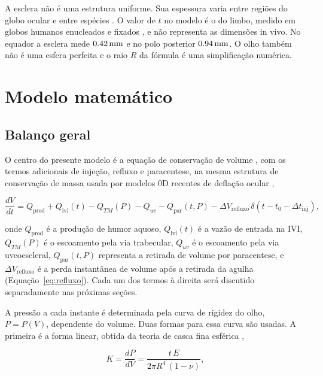 A esclera não é uma estrutura uniforme. Sua espessura varia entre regiões do globo ocular e entre espécies \citep{vurgese2012,olsen1998,prince1960}. O valor de $t$ no modelo é o do limbo, medido em globos humanos enucleados e fixados \citep{vurgese2012}, e não representa as dimensões in vivo. No equador a esclera mede $\SI{0{,}42}{\milli\meter}$ e no polo posterior $\SI{0{,}94}{\milli\meter}$. O olho também não é uma esfera perfeita e o raio $R$ da fórmula é uma simplificação numérica.

\section{Modelo matemático}

\subsection{Balanço geral}
\label{sec:balanco_geral}

O centro do presente modelo é a equação de conservação de volume \citep{goel2010}, com os termos adicionais de injeção, refluxo e paracentese, na mesma estrutura de conservação de massa usada por modelos 0D recentes de deflação ocular \citep{ruffini2024},

\begin{equation}
\frac{dV}{dt} = Q_{\text{prod}} + Q_{\text{ivi}}(t) - Q_{TM}(P) - Q_{uv} - Q_{\text{par}}(t,P) - \Delta V_{\text{refluxo}}\,\delta\!\left(t-t_0-\Delta t_{\text{inj}}\right),
\label{eq:balanco}
\end{equation}

onde $Q_{\text{prod}}$ é a produção de humor aquoso, $Q_{\text{ivi}}(t)$ é a vazão de entrada na IVI, $Q_{TM}(P)$ é o escoamento pela via trabecular, $Q_{uv}$ é o escoamento pela via uveoescleral, $Q_{\text{par}}(t,P)$ representa a retirada de volume por paracentese, e $\Delta V_{\text{refluxo}}$ é a perda instantânea de volume após a retirada da agulha (Equação~\ref{eq:refluxo}). Cada um dos termos à direita será discutido separadamente nas próximas seções.

A pressão a cada instante é determinada pela curva de rigidez do olho, $P=P(V)$, dependente do volume. Duas formas para essa curva são usadas. A primeira é a forma linear, obtida da teoria de casca fina esférica \citep{timoshenko1959},

\begin{equation}
K = \frac{dP}{dV} = \frac{t\,E}{2\pi R^4\,(1-\nu)},
\label{eq:casca_fina}
\end{equation}

